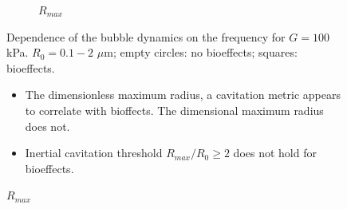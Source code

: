 \begin{frame}
\begin{figure}
\begin{subfigure}{0.43\textwidth}
      \caption[Dependence of maximum dimensional bubble radius on pulse frequency]{$R_{max}$}
      \label{fig:usbe_bubble_dradius_frequency}
    \end{subfigure}
    \vspace*{-0.25cm}
    \begin{flushleft}
      {\small
      Dependence of the bubble dynamics on the frequency for $G=100$
      kPa. $R_0=0.1-2$ $\mu$m; empty circles: no bioeffects; squares:
      bioeffects.}
    \end{flushleft}
    {\small
    \begin{itemize}
    \item The dimensionless maximum radius, a cavitation metric appears to correlate with bioffects. The dimensional maximum radius does not.
    \item Inertial cavitation threshold $R_{max}/R_0\geq2$ does not hold for bioeffects.
    \end{itemize}
    }

  \end{figure}
\end{frame}
% 
% 
